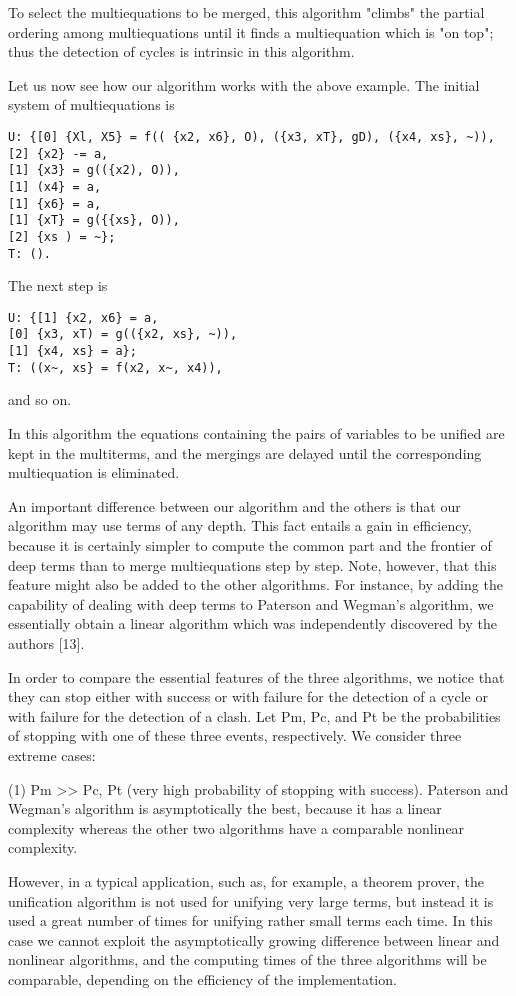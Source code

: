 To select the multiequations to be merged, this algorithm "climbs" the partial
ordering among multiequations until it finds a multiequation which is "on top";
thus the detection of cycles is intrinsic in this algorithm. 

Let us now see how our algorithm works with the above example. The initial
system of multiequations is
\begin{verbatim}
U: {[0] {Xl, X5} = f(( {x2, x6}, O), ({x3, xT}, gD), ({x4, xs}, ~)),
[2] {x2} -= a,
[1] {x3} = g(({x2), O)),
[1] (x4} = a,
[1] {x6} = a,
[1] {xT} = g({{xs}, O)),
[2] {xs ) = ~};
T: (). 
\end{verbatim}

The next step is
\begin{verbatim}
U: {[1] {x2, x6} = a,
[0] {x3, xT) = g(({x2, xs}, ~)),
[1] {x4, xs} = a};
T: ((x~, xs} = f(x2, x~, x4)),
\end{verbatim}
and so on. 

In this algorithm the equations containing the pairs of variables to be unified
are kept in the multiterms, and the mergings are delayed until the corresponding
multiequation is eliminated. 

An important difference between our algorithm and the others is that our
algorithm may use terms of any depth. This fact entails a gain in efficiency,
because it is certainly simpler to compute the common part and the frontier of
deep terms than to merge multiequations step by step. Note, however, that this
feature might also be added to the other algorithms. For instance, by adding the
capability of dealing with deep terms to Paterson and Wegman's algorithm, we
essentially obtain a linear algorithm which was independently discovered by the
authors [13]. 

In order to compare the essential features of the three algorithms, we notice
that they can stop either with success or with failure for the detection of a cycle
or with failure for the detection of a clash. Let Pm, Pc, and Pt be the probabilities
of stopping with one of these three events, respectively. We consider three
extreme cases: 

(1) Pm >> Pc, Pt (very high probability of stopping with success). Paterson
and Wegman's algorithm is asymptotically the best, because it has a linear
complexity whereas the other two algorithms have a comparable nonlinear
complexity. 

However, in a typical application, such as, for example, a theorem prover, the
unification algorithm is not used for unifying very large terms, but instead it is
used a great number of times for unifying rather small terms each time. In this
case we cannot exploit the asymptotically growing difference between linear and
nonlinear algorithms, and the computing times of the three algorithms will be
comparable, depending on the efficiency of the implementation. 

